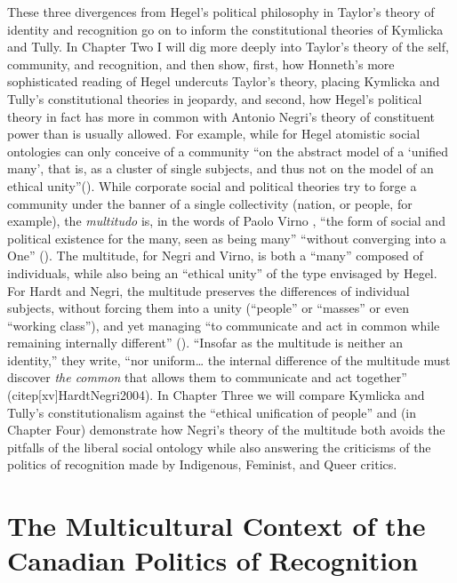 \documentclass[12pt,oneside]{memoir}
\begin{document}
These three divergences from Hegel's political philosophy in Taylor's theory of identity and recognition go on to inform the constitutional theories of Kymlicka and Tully. In Chapter Two I will dig more deeply into Taylor's theory of the self, community, and recognition, and then show, first, how Honneth's more sophisticated reading of Hegel undercuts Taylor's theory, placing Kymlicka and Tully's constitutional theories in jeopardy, and second, how Hegel's political theory in fact has more in common with Antonio Negri's theory of constituent power than is usually allowed. For example, while for Hegel atomistic social ontologies can only conceive of a community ``on the abstract model of a `unified many', that is, as a cluster of single subjects, and thus not on the model of an ethical unity''(\citep[12]{honneth-struggle}). While corporate social and political theories try to forge a community under the banner of a single collectivity (nation, or people, for example), the \textit{multitudo }is, in the words of Paolo Virno , ``the form of social and political existence for the many, seen as being many'' ``without converging into a One'' (\citep[21]{Virno2004}). The multitude, for Negri and Virno, is both a ``many'' composed of individuals, while also being an ``ethical unity'' of the type envisaged by Hegel.
For Hardt and Negri, the multitude preserves the differences of individual subjects, without forcing them into a unity (``people'' or ``masses'' or even ``working class''), and yet managing  ``to communicate and act in common while remaining internally different'' (\citep[xiv]{HardtNegri2004}). ``Insofar as the multitude is neither an identity,'' they write, ``nor uniform{\ldots} the internal difference of the multitude must discover \textit{the common} that allows them to communicate and act together'' (citep[xv]{HardtNegri2004}). In Chapter Three we will compare Kymlicka and Tully's constitutionalism against the ``ethical unification of people'' and (in Chapter Four) demonstrate how Negri's theory of the multitude both avoids the pitfalls of the liberal social ontology while also answering the criticisms of the politics of recognition made by Indigenous, Feminist, and Queer critics.

\section{The Multicultural Context of the Canadian Politics of Recognition}
\label{scrivauto:8}
\end{document}
